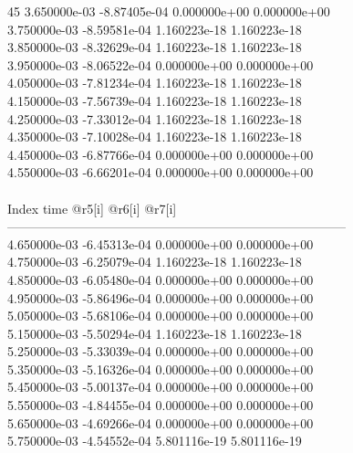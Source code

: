 45	3.650000e-03	-8.87405e-04	0.000000e+00	0.000000e+00	\\ 	3.750000e-03	-8.59581e-04	1.160223e-18	1.160223e-18	\\ 	3.850000e-03	-8.32629e-04	1.160223e-18	1.160223e-18	\\ 	3.950000e-03	-8.06522e-04	0.000000e+00	0.000000e+00	\\ 	4.050000e-03	-7.81234e-04	1.160223e-18	1.160223e-18	\\ 	4.150000e-03	-7.56739e-04	1.160223e-18	1.160223e-18	\\ 	4.250000e-03	-7.33012e-04	1.160223e-18	1.160223e-18	\\ 	4.350000e-03	-7.10028e-04	1.160223e-18	1.160223e-18	\\ 	4.450000e-03	-6.87766e-04	0.000000e+00	0.000000e+00	\\ 	4.550000e-03	-6.66201e-04	0.000000e+00	0.000000e+00	\\ \hline
\\ \hline
Index   time            @r5[i]          @r6[i]          @r7[i]          \\ \hline
--------------------------------------------------------------------------------\\ 	4.650000e-03	-6.45313e-04	0.000000e+00	0.000000e+00	\\ 	4.750000e-03	-6.25079e-04	1.160223e-18	1.160223e-18	\\ 	4.850000e-03	-6.05480e-04	0.000000e+00	0.000000e+00	\\ 	4.950000e-03	-5.86496e-04	0.000000e+00	0.000000e+00	\\ 	5.050000e-03	-5.68106e-04	0.000000e+00	0.000000e+00	\\ 	5.150000e-03	-5.50294e-04	1.160223e-18	1.160223e-18	\\ 	5.250000e-03	-5.33039e-04	0.000000e+00	0.000000e+00	\\ 	5.350000e-03	-5.16326e-04	0.000000e+00	0.000000e+00	\\ 	5.450000e-03	-5.00137e-04	0.000000e+00	0.000000e+00	\\ 	5.550000e-03	-4.84455e-04	0.000000e+00	0.000000e+00	\\ 	5.650000e-03	-4.69266e-04	0.000000e+00	0.000000e+00	\\ 	5.750000e-03	-4.54552e-04	5.801116e-19	5.801116e-19	\\ \hline
